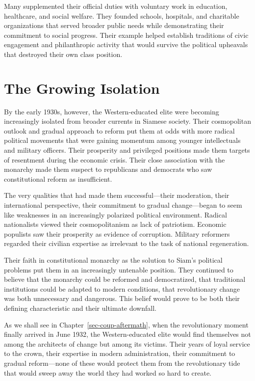 \documentclass[
  Letterpaper,
]{scrbook}
\begin{document}
Many supplemented their official duties with voluntary work in
education, healthcare, and social welfare. They founded schools,
hospitals, and charitable organizations that served broader public needs
while demonstrating their commitment to social progress. Their example
helped establish traditions of civic engagement and philanthropic
activity that would survive the political upheavals that destroyed their
own class position.

\section{The Growing Isolation}\label{the-growing-isolation}

By the early 1930s, however, the Western-educated elite were becoming
increasingly isolated from broader currents in Siamese society. Their
cosmopolitan outlook and gradual approach to reform put them at odds
with more radical political movements that were gaining momentum among
younger intellectuals and military officers. Their prosperity and
privileged positions made them targets of resentment during the economic
crisis. Their close association with the monarchy made them suspect to
republicans and democrats who saw constitutional reform as insufficient.

The very qualities that had made them successful---their moderation,
their international perspective, their commitment to gradual
change---began to seem like weaknesses in an increasingly polarized
political environment. Radical nationalists viewed their cosmopolitanism
as lack of patriotism. Economic populists saw their prosperity as
evidence of corruption. Military reformers regarded their civilian
expertise as irrelevant to the task of national regeneration.

Their faith in constitutional monarchy as the solution to Siam's
political problems put them in an increasingly untenable position. They
continued to believe that the monarchy could be reformed and
democratized, that traditional institutions could be adapted to modern
conditions, that revolutionary change was both unnecessary and
dangerous. This belief would prove to be both their defining
characteristic and their ultimate downfall.

As we shall see in Chapter~\ref{sec-coup-aftermath}, when the
revolutionary moment finally arrived in June 1932, the Western-educated
elite would find themselves not among the architects of change but among
its victims. Their years of loyal service to the crown, their expertise
in modern administration, their commitment to gradual reform---none of
these would protect them from the revolutionary tide that would sweep
away the world they had worked so hard to create.
\end{document}
